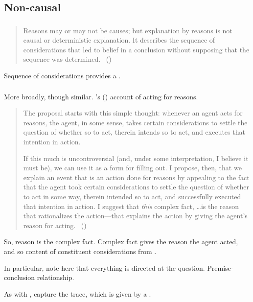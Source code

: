 \subsection{Non-causal}
\label{cha:var:sec:non-causal}

\subsubsection{\textcite{Harman:1973ww}}

\begin{note}
  \begin{quote}
    Reasons may or may not be causes; but explanation by reasons is not causal or deterministic explanation.
    It describes the sequence of considerations that led to belief in a conclusion without supposing that the sequence was determined.%
    \mbox{ }\hfill\mbox{(\citeyear[52]{Harman:1973ww})}
  \end{quote}

  Sequence of considerations provides a \wit{}.
\end{note}

\subsubsection{\textcite{Hieronymi:2011aa}}

\begin{note}
  More broadly, though similar.
  \citeauthor{Hieronymi:2011aa}'s (\citeyear{Hieronymi:2011aa}) account of acting for reasons.

  \begin{quote}
    The proposal starts with this simple thought: whenever an agent acts for reasons, the agent, in some sense, takes certain considerations to settle the question of whether so to act, therein intends so to act, and executes that intention in action.

    If this much is uncontroversial (and, under some interpretation, I believe it must be), we can use it as a form for filling out.
    I propose, then, that we explain an event that is an action done for reasons by appealing to the fact that the agent took certain considerations to settle the question of whether to act in some way, therein intended so to act, and successfully executed that intention in action.
    I suggest that \emph{this} complex fact, \dots is the reason that rationalizes the action---that explains the action by giving the agent’s reason for acting.\newline
    \mbox{ }\hfill\mbox{(\citeyear[431]{Hieronymi:2011aa})}
  \end{quote}

  So, reason is the complex fact.
  Complex fact gives the reason the agent acted, and so content of constituent considerations from \agpe{}.

  In particular, note here that everything is directed at the question.
  Premise-conclusion relationship.

  As with \citeauthor{Harman:1973ww}, capture the trace, which is given by a \wit{}.
\end{note}

